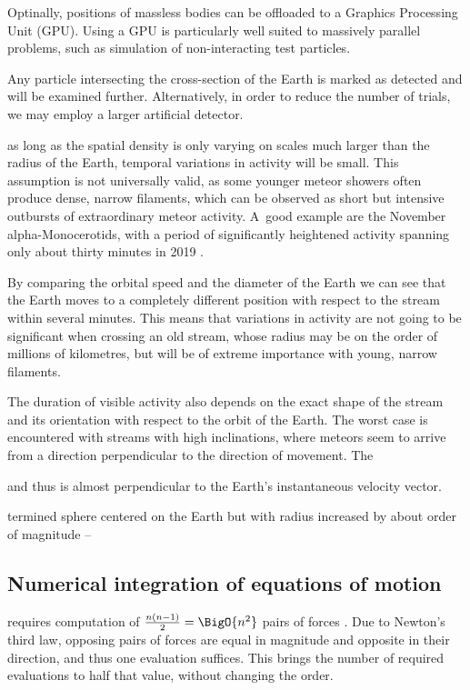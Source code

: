     Optinally, positions of massless bodies can be offloaded to a Graphics Processing Unit (GPU).
    Using a GPU is particularly well suited to massively parallel problems, such as simulation of non-interacting test particles.

    Any particle intersecting the cross-section of the Earth is marked as detected and will be examined further.
    Alternatively, in order to reduce the number of trials, we may employ a larger artificial detector.


    as long as the spatial density is only varying on scales much larger than the radius of the Earth,
    temporal variations in activity will be small.
    This assumption is not universally valid, as some younger meteor showers often produce dense, narrow filaments,
    which can be observed as short but intensive outbursts of extraordinary meteor activity.
    A~good example are the November alpha-Monocerotids, with a period of significantly
    heightened activity spanning only about thirty minutes in 2019 \citep{CBET4692}.

    By comparing the orbital speed and the diameter of the Earth we can see that the Earth moves
    to a completely different position with respect to the stream within several minutes.
    This means that variations in activity are not going to be significant when crossing an old stream,
    whose radius may be on the order of millions of kilometres, but will be of extreme importance with young, narrow filaments.

    The duration of visible activity also depends on the exact shape of the stream and its orientation with respect to the orbit of the Earth.
    The worst case is encountered with streams with high inclinations, where meteors seem to arrive from a direction perpendicular
    to the direction of movement. The 

     and thus is almost perpendicular to the Earth's instantaneous velocity vector.



    termined sphere centered on the Earth but with
    radius increased by about  order of magnitude --

    \subsection{Numerical integration of equations of motion} \label{asi}
        requires computation of $\frac{n\left(n - 1\right)}{2} = \BigO{n^2}$ pairs of forces \cite{...}.
        Due to Newton's third law, opposing pairs of forces are equal in magnitude and opposite in their direction,
        and thus one evaluation suffices. This brings the number of required evaluations to half that value,
        without changing the order.


